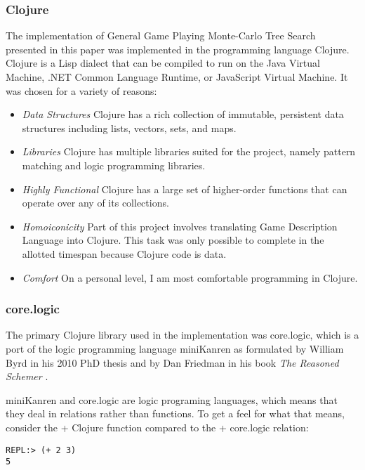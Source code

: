 \documentclass[letterpaper]{article}
\begin{document}
\subsubsection{Clojure}
The implementation of General Game Playing Monte-Carlo Tree Search presented in this paper was implemented in the programming language Clojure. Clojure is a Lisp dialect that can be compiled to run on the Java Virtual Machine, .NET Common Language Runtime, or JavaScript Virtual Machine. It was chosen for a variety of reasons:
\begin{itemize}

\item \emph{Data Structures} Clojure has a rich collection of immutable, persistent data structures including lists, vectors, sets, and maps.
\item \emph{Libraries} Clojure has multiple libraries suited for the project, namely pattern matching and logic programming libraries.
\item \emph{Highly Functional} Clojure has a large set of higher-order functions that can operate over any of its collections.
\item \emph{Homoiconicity} Part of this project involves translating Game Description Language into Clojure. This task was only possible to complete in the allotted timespan because Clojure code is data.
\item \emph{Comfort} On a personal level, I am most comfortable programming in Clojure.
\end{itemize}
\subsubsection{core.logic}

The primary Clojure library used in the implementation was core.logic, which is a port of the logic programming language miniKanren as formulated by William Byrd in his 2010 PhD thesis \cite{byrd2010relational} and by Dan Friedman in his book \emph{The Reasoned Schemer} \cite{reasonedschemer}.

miniKanren and core.logic are logic programing languages, which means that they deal in relations rather than functions. To get a feel for what that means, consider the + Clojure function compared to the + core.logic relation:

\begin{lstlisting}[frame=single, caption=The + function]
REPL:> (+ 2 3)
5
\end{lstlisting}
\end{document}

